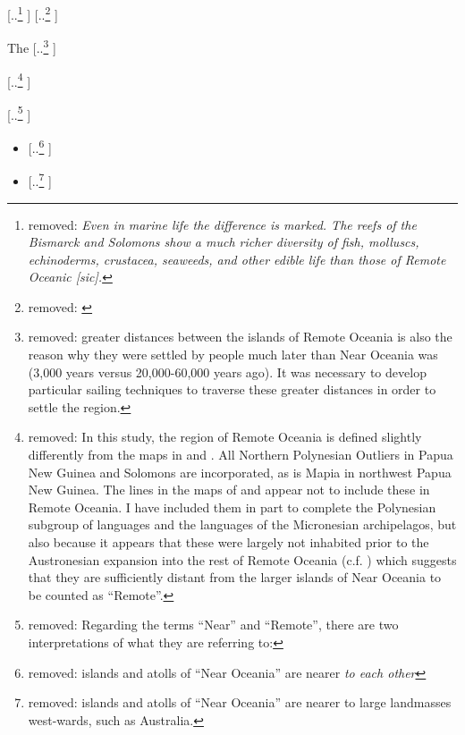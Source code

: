 \documentclass[unnumsec,webpdf,modern,medium]{oup-authoring-template}
\providecommand{\DIFdeltex}[1]{{\protect\color{red} [..\footnote{removed: #1} ]}} %
\providecommand{\DIFdelbegin}{} %
\providecommand{\DIFdelend}{} %
\providecommand{\DIFdel}[1]{\texorpdfstring{\DIFdeltex{#1}}{}} %
\newcommand{\DIFscaledelfig}{0.5}
\newlength{\DIFdelgraphicswidth} %
\newlength{\DIFdelgraphicsheight} %
\newcommand{\DIFdelincludegraphics}[2][]{%
\sbox{\DIFdelgraphicsbox}{\DIFOincludegraphics[#1]{#2}}%
\settoboxwidth{\DIFdelgraphicswidth}{\DIFdelgraphicsbox} %
\settoboxtotalheight{\DIFdelgraphicsheight}{\DIFdelgraphicsbox} %
\scalebox{\DIFscaledelfig}{%
\parbox[b]{\DIFdelgraphicswidth}{\usebox{\DIFdelgraphicsbox}\\[-\baselineskip] \rule{\DIFdelgraphicswidth}{0em}}\llap{\resizebox{\DIFdelgraphicswidth}{\DIFdelgraphicsheight}{%
\setlength{\unitlength}{\DIFdelgraphicswidth}%
\begin{picture}(1,1)%
\thicklines\linethickness{2pt} %
{\color[rgb]{1,0,0}\put(0,0){\framebox(1,1){}}}%
{\color[rgb]{1,0,0}\put(0,0){\line( 1,1){1}}}%
{\color[rgb]{1,0,0}\put(0,1){\line(1,-1){1}}}%
\end{picture}%
}\hspace*{3pt}}} %
} %
\DeclareRobustCommand{\DIFdelbegin}{\DIFOdelbegin \let\includegraphics\DIFdelincludegraphics} %
\DeclareRobustCommand{\DIFdelend}{\DIFOaddend \let\includegraphics\DIFOincludegraphics} %
\begin{document}
\DIFdel{\emph{Even in marine life the difference is marked. The reefs of the Bismarck and Solomons show a much richer diversity of fish, molluscs, echinoderms, crustacea, seaweeds, and other edible life than those of Remote Oceanic [sic].}
}%
\DIFdel{\citet[19]{pawley2007locatingoceanic} }%
\DIFdelend %

The \DIFdelbegin \DIFdel{greater distances between the islands of Remote Oceania is also the reason why they were settled by people much later than Near Oceania was (3,000 years versus 20,000-60,000 years ago). It was necessary to develop particular sailing techniques to traverse these greater distances in order to settle the region.
}%

\DIFdel{In this study, the region of Remote Oceania is defined slightly differently from the maps in \citet{green1991near} and \citet{pawley2007locatingoceanic}. All Northern Polynesian Outliers in Papua New Guinea and Solomons are incorporated, as is Mapia in northwest Papua New Guinea. The lines in the maps of \citet{green1991near} and \citet{pawley2007locatingoceanic} appear not to include these in Remote Oceania. I have included them in part to complete the Polynesian subgroup of languages and the languages of the Micronesian archipelagos, but also because it appears that these were largely not inhabited prior to the Austronesian expansion into the rest of Remote Oceania (c.f. \citet[23]{kirch2012basline}) which suggests that they are sufficiently distant from the larger islands of Near Oceania to be counted as ``Remote''.
}%

\DIFdel{Regarding the terms ``Near'' and ``Remote'', there are two interpretations of what they are referring to:
}%

\begin{itemize}%
\item%
\DIFdel{islands and atolls of ``Near Oceania'' are nearer \emph{to each other} 
    }%
\item%
\DIFdel{islands and atolls of ``Near Oceania'' are nearer to large landmasses west-wards, such as Australia.
}
\end{itemize}%
\end{document}
